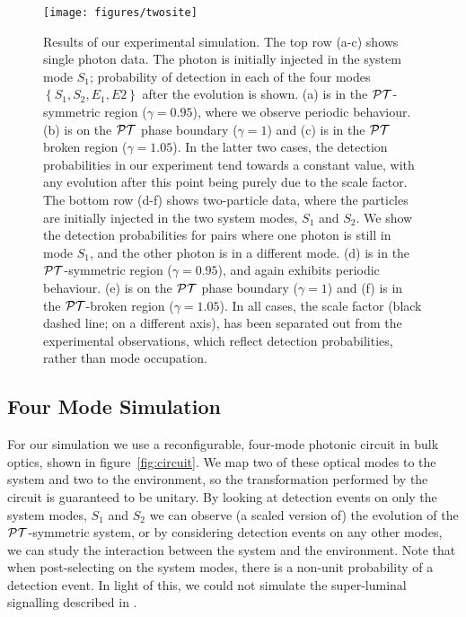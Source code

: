 \begin{figure}[p]
  \centering
  \texttt{[image: figures/twosite]}
  \caption[Experimental data from simulation of the 2-site PT symmetric model]
    {Results of our experimental simulation. The top row (a-c) shows
    single photon data. The photon is initially injected in the system mode
    \(S_1\); probability of detection in each of the four modes \(\left\{S_1,
    S_2, E_1, E2\right\}\) after the evolution is shown. (a) is in the
    \(\mathcal{PT}{}\)-symmetric region (\(\gamma=0.95\)), where we observe periodic
    behaviour. (b) is on the \(\mathcal{PT}{}\) phase boundary (\(\gamma=1\)) and (c) is
    in the \(\mathcal{PT}{}\) broken region (\(\gamma=1.05\)). In the latter two cases,
    the detection probabilities in our
    experiment tend towards a constant value, with any evolution after this
    point being purely due to the scale factor. The bottom row (d-f) shows
    two-particle data, where the particles are initially injected in the two
    system modes, \(S_1\) and \(S_2\). We show the detection probabilities for
    pairs where one photon is still in mode \(S_1\), and the other photon is in
    a different mode. (d) is in the \(\mathcal{PT}{}\)-symmetric region
    (\(\gamma=0.95\)), and again exhibits periodic behaviour. (e) is on the
    \(\mathcal{PT}{}\) phase boundary (\(\gamma=1\)) and (f) is in the \(\mathcal{PT}{}\)-broken
    region (\(\gamma=1.05\)). In all cases, the scale factor (black dashed
    line; on a different axis), has been separated out from the experimental
    observations, which reflect detection probabilities, rather than mode
    occupation.}
  \label{fig:twosite}
\end{figure}

\subsection{Four Mode Simulation}
\label{sec:FourMode}
For our simulation we use a reconfigurable, four-mode photonic circuit in bulk
optics, shown in figure~\ref{fig:circuit}. We map two of these optical
modes to the system and two to the environment, so the transformation performed
by the circuit is guaranteed to be unitary. By looking at detection events on
only the system modes, \(S_1\) and \(S_2\) we can observe (a scaled version of)
the evolution of the \(\mathcal{PT}{}\)-symmetric system, or by considering detection
events on any other modes, we can study the interaction between the system and
the environment. Note that when post-selecting on the system modes, there is a
non-unit probability of a detection event. In light of this, we could not
simulate the super-luminal signalling described in \cite{lee-prl-112-130404}.

